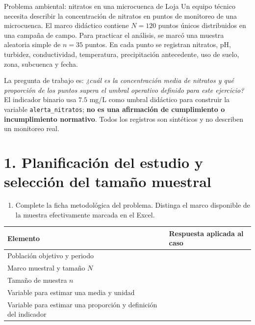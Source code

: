 \documentclass[11pt,a4paper]{article}
\begin{document}
\begin{casobox}{Problema ambiental: nitratos en una microcuenca de Loja}
Un equipo técnico necesita describir la concentración de nitratos en puntos de monitoreo de una microcuenca. El marco didáctico contiene $N=120$ puntos únicos distribuidos en una campaña de campo. Para practicar el análisis, se marcó una muestra aleatoria simple de $n=35$ puntos. En cada punto se registran nitratos, pH, turbidez, conductividad, temperatura, precipitación antecedente, uso de suelo, zona, subcuenca y fecha.

La pregunta de trabajo es: \emph{¿cuál es la concentración media de nitratos y qué proporción de los puntos supera el umbral operativo definido para este ejercicio?} El indicador binario usa $7.5$ mg/L como umbral didáctico para construir la variable \texttt{alerta\_nitratos}; \textbf{no es una afirmación de cumplimiento o incumplimiento normativo}. Todos los registros son sintéticos y no describen un monitoreo real.
\end{casobox}

\section*{1. Planificación del estudio y selección del tamaño muestral}
\begin{enumerate}[label=\textbf{\arabic*.}]
\item Complete la ficha metodológica del problema. Distinga el marco disponible de la muestra efectivamente marcada en el Excel.
\end{enumerate}
\small
\begin{tabularx}{\linewidth}{L{4.0cm}Y}
\toprule
\textbf{Elemento} & \textbf{Respuesta aplicada al caso} \\
\midrule
Población objetivo y periodo & \\
Marco muestral y tamaño $N$ & \\
Tamaño de muestra $n$ & \\
Variable para estimar una media y unidad & \\
Variable para estimar una proporción y definición del indicador & \\
\bottomrule
\end{tabularx}
\normalsize
\end{document}
